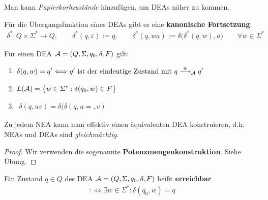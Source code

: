 Man kann \textit{Papierkorbzustände} hinzufügen, um DEAs näher zu kommen.

\begin{definition}\label{def2.3}
	Für die Übergangsfunktion eines DEAs gibt es eine \textbf{kanonische Fortsetzung}:
	\begin{align*}
		\delta^\ast:Q\times\Sigma^\ast\to Q,\qquad
		\delta^\ast(q,\varepsilon):=q,\qquad
		\delta^\ast(q,wa):=\delta\big(\delta^\ast(q,w),a\big)\qquad\forall w\in\Sigma^\ast
	\end{align*}
\end{definition}

\begin{bemerkungnr}\label{bemerkungDEA}
	Für einen DEA $\mathcal{A}=(Q,\Sigma,q_0,\delta,F)$ gilt:
	\begin{enumerate}
		\item $\begin{aligned}
			\delta(q,w)=q'\Longleftrightarrow g'\text{ ist der eindeutige Zustand mit }q\overset{w}{\longrightarrow}_{\mathcal{A}} q'
		\end{aligned}$
		\item $\begin{aligned}
			L(\mathcal{A})=\big\lbrace w\in\Sigma^\ast:\delta(q_0,w)\in F\big\rbrace
		\end{aligned}$
		\item $\begin{aligned}
			\delta(q,uv)=\delta\big(\delta(q,u=,v)
		\end{aligned}$
	\end{enumerate}
\end{bemerkungnr}

\begin{satz}\label{satz2.4}
	Zu jedem NEA kann man effektiv einen äquivalenten DEA konstruieren, d.h. NEAs und DEAs sind \textit{gleichmächtig}.
\end{satz}

\begin{proof}
	Wir verwenden die sogenannte \textbf{Potenzmengenkonstruktion}. Siehe Übung.
\end{proof}

\begin{definition}
	Ein Zustand $q\in Q$ des DEA $\mathcal{A}=(Q,\Sigma,q_0,\delta,F)$ heißt \textbf{erreichbar}
	\begin{align*}
		:\Longleftrightarrow\exists w\in\Sigma^\ast:\delta(q_0,w)=q
	\end{align*}
\end{definition}

